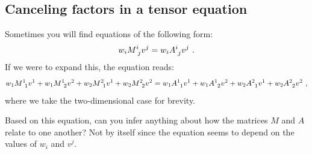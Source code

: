 \documentclass[12pt, oneside]{report}    %
\newenvironment{wide}{\begin{adjustwidth}{0cm}{-6.25cm}}{\end{adjustwidth}}
\let\oldsection\section
\def\section{%
  \setcounter{sidenote}{1}%
  \oldsection
}
\begin{document}
\begin{subappendices}
\section{Canceling factors in a tensor equation}

\begin{wide}
Sometimes you will find equations of the following form:
\begin{align}
    w_i M\aij{i}{j}v^j = w_i A\aij{i}{j}v^j \ .
    \label{eq:canceling:factors:wMv}
\end{align}
If we were to expand this, the equation reads:
\begin{align}
    w_1 M\aij{1}{1}v^1 + w_1 M\aij{1}{2}v^2
    + w_2 M\aij{2}{1}v^1 + w_2 M\aij{2}{2}v^2
    =
    w_1 A\aij{1}{1}v^1 + w_1 A\aij{1}{2}v^2
    + w_2 A\aij{2}{1}v^1 + w_2 A\aij{2}{2}v^2 \ ,
    \label{eq:canceling:factors:wMv:long}
\end{align}
where we take the two-dimensional case for brevity. 
\end{wide}

Based on this equation, can you infer anything about how the matrices $M$ and $A$ relate to one another? Not by itself since the equation seems to depend on the values of $w_i$ and $v^j$. 


\end{subappendices}
\end{document}
